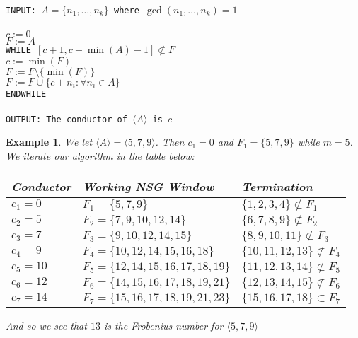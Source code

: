 \documentclass[11pt]{amsart}
\theoremstyle{plain}
\newtheorem{exa}{Example}
\theoremstyle{definition}
\begin{document}
\texttt{
\noindent
\\INPUT: $A=\{n_1,\dots,n_k\}$ where $\gcd(n_1,\dots,n_k)=1$\\
\hspace*{\fill}\\
\hspace*{1em}$c:=0$ \\
\hspace*{1em}$F:=A$ \\
\hspace*{1em}WHILE $[c+1,c+\min(A)-1]\not\subset F$ \\
\hspace*{2em}$c:=\min(F)$\\
\hspace*{2em}$F:=F\setminus\{\min(F)\}$\\
\hspace*{2em}$F:=F\cup\{c+n_i:\forall n_i\in A\}$\\
\hspace*{1em}ENDWHILE\\
\hspace*{\fill}\\
OUTPUT: The conductor of $\langle A\rangle$ is $c$
}

\begin{exa}
We let $\langle A\rangle=\langle 5,7,9\rangle$. Then $c_1=0$ and $F_1=\{5,7,9\}$ while $m=5$. We iterate our algorithm in the table below:

\begin{center}
\begin{tabular}{l|l|l}
  Conductor&Working NSG Window&Termination\\
  \hline
  $c_1=0$&$F_1=\{5,7,9\}$&$\{1,2,3,4\}\not\subset F_1$\\
  $c_2=5$&$F_2=\{7,9,10,12,14\}$&$\{6,7,8,9\}\not\subset F_2$\\
  $c_3=7$&$F_3=\{9,10,12,14,15\}$&$\{8,9,10,11\}\not\subset F_3$\\
  $c_4=9$&$F_4=\{10,12,14,15,16,18\}$&$\{10,11,12,13\}\not\subset F_4$\\
  $c_5=10$&$F_5=\{12,14,15,16,17,18,19\}$&$\{11,12,13,14\}\not\subset F_5$\\
  $c_6=12$&$F_6=\{14,15,16,17,18,19,21\}$&$\{12,13,14,15\}\not\subset F_6$\\
  $c_7=14$&$F_7=\{15,16,17,18,19,21,23\}$&$\{15,16,17,18\}\subset F_7$\\
\end{tabular}
\end{center}
And so we see that $13$ is the Frobenius number for $\langle 5,7,9\rangle$
\end{exa}
\end{document}
